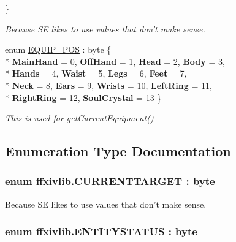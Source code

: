 \begin{DoxyCompactItemize}
 \}
\begin{DoxyCompactList}\small\item\em Because S\-E likes to use values that don't make sense. \end{DoxyCompactList}\item 
enum \hyperlink{namespaceffxivlib_a08bcc753fec0a3174d818ecaa25aec4f}{E\-Q\-U\-I\-P\-\_\-\-P\-O\-S} \-: byte \{ \\*
{\bfseries Main\-Hand} = 0, 
{\bfseries Off\-Hand} = 1, 
{\bfseries Head} = 2, 
{\bfseries Body} = 3, 
\\*
{\bfseries Hands} = 4, 
{\bfseries Waist} = 5, 
{\bfseries Legs} = 6, 
{\bfseries Feet} = 7, 
\\*
{\bfseries Neck} = 8, 
{\bfseries Ears} = 9, 
{\bfseries Wrists} = 10, 
{\bfseries Left\-Ring} = 11, 
\\*
{\bfseries Right\-Ring} = 12, 
{\bfseries Soul\-Crystal} = 13
 \}
\begin{DoxyCompactList}\small\item\em This is used for get\-Current\-Equipment() \end{DoxyCompactList}\end{DoxyCompactItemize}


\subsection{Enumeration Type Documentation}
\hypertarget{namespaceffxivlib_a027fd426531e3a42243f5c2b946dde31}{
\subsubsection[{C\-U\-R\-R\-E\-N\-T\-T\-A\-R\-G\-E\-T}]{\setlength{\rightskip}{0pt plus 5cm}enum {\bf ffxivlib.\-C\-U\-R\-R\-E\-N\-T\-T\-A\-R\-G\-E\-T} \-: byte}}\label{namespaceffxivlib_a027fd426531e3a42243f5c2b946dde31}


Because S\-E likes to use values that don't make sense. 

\hypertarget{namespaceffxivlib_a93f054414b7ccf7ba7c36f54fcc392f5}{
\subsubsection[{E\-N\-T\-I\-T\-Y\-S\-T\-A\-T\-U\-S}]{\setlength{\rightskip}{0pt plus 5cm}enum {\bf ffxivlib.\-E\-N\-T\-I\-T\-Y\-S\-T\-A\-T\-U\-S} \-: byte}}\label{namespaceffxivlib_a93f054414b7ccf7ba7c36f54fcc392f5}


